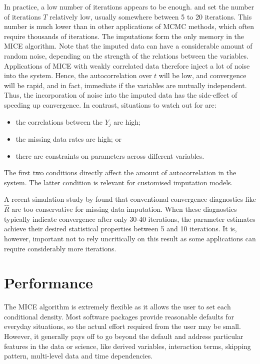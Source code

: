 \documentclass[
]{book}
\providecommand{\tightlist}{%
  \setlength{\itemsep}{0pt}\setlength{\parskip}{0pt}}
\begin{document}
In practice, a low number of iterations appears to be enough. \citet{BRAND1999} and \citet{VANBUUREN1999} set the number of iterations \(T\) relatively low, usually somewhere between 5 to 20 iterations. This number is much lower than in other applications of MCMC methods, which often require thousands of iterations. The imputations form the only memory in the MICE algorithm. Note that the imputed data can have a considerable amount of random noise, depending on the strength of the relations between the variables. Applications of MICE with weakly correlated data therefore inject a lot of noise into the system. Hence, the autocorrelation over \(t\) will be low, and convergence will be rapid, and in fact, immediate if the variables are mutually independent. Thus, the incorporation of noise into the imputed data has the side-effect of speeding up convergence. In contrast, situations to watch out for are:

\begin{itemize}
\tightlist
\item
  the correlations between the \(Y_j\) are high;
\item
  the missing data rates are high; or
\item
  there are constraints on parameters across different variables.
\end{itemize}

The first two conditions directly affect the amount of autocorrelation in the system. The latter condition is relevant for customised imputation models.

A recent simulation study by \citet{OBERMAN2020} found that conventional convergence diagnostics like \(\hat R\) \citep{GELMAN1991} are too conservative for missing data imputation. When these diagnostics typically indicate convergence after only 30-40 iterations, the parameter estimates achieve their desired statistical properties between 5 and 10 iterations. It is, however, important not to rely uncritically on this result as some applications can require considerably more iterations.

\section{Performance}\label{performance}

The MICE algorithm is extremely flexible as it allows the user to set each conditional density. Most software packages provide reasonable defaults for everyday situations, so the actual effort required from the user may be small. However, it generally pays off to go beyond the default and address particular features in the data or science, like derived variables, interaction terms, skipping pattern, multi-level data and time dependencies.
\end{document}
